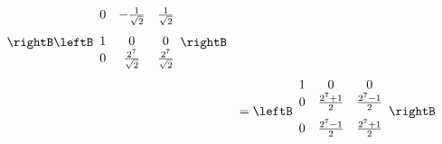 \begin{solution}
\[\begin{array}{rr}
\begin{array}{ccc}
\end{array}
\rightB
\leftB
\begin{array}{ccc}
0 & -\vspace{0.05in}\frac{1}{\sqrt{2}} & \vspace{0.05in}\frac{1}{\sqrt{2}}\\ 
1 & 0 & 0 \\ 
0 & \vspace{0.05in}\frac{2^7}{\sqrt{2}} & \vspace{0.05in}\frac{2^7}{\sqrt{2}}
\end{array} \rightB  \\
& = 
\leftB
\begin{array}{ccc}
1 & 0 & 0 \\ 
0 & \vspace{0.05in}\frac{2^7+1}{2} & \vspace{0.05in}\frac{2^7-1}{2}\\ 
0 & \vspace{0.05in}\frac{2^7-1}{2} & \vspace{0.05in}\frac{2^7+1}{2}
\end{array} \rightB  \\

\end{array}
\]
\end{solution}